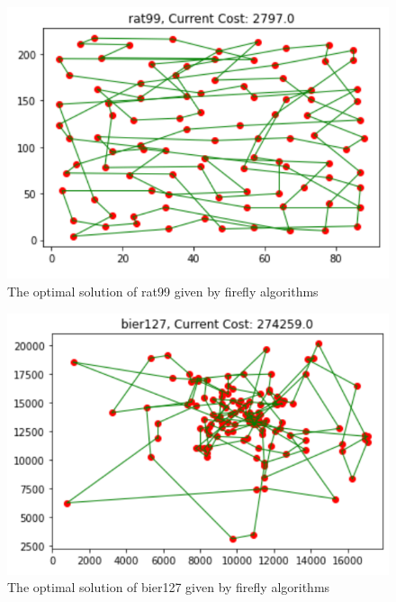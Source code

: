 \documentclass[twocolumn, a4paper]{extarticle}
\begin{document}
\begin{figure}[H]
	\centering
	\includegraphics[width=0.95\linewidth]{figure/fire_rat99}
	\caption{The optimal solution of rat99 given by firefly algorithms}
	\label{fig:firerat99}
\end{figure}

\begin{figure}[H]
	\centering
	\includegraphics[width=0.95\linewidth]{figure/fire_bier127}
	\caption{The optimal solution of bier127 given by firefly algorithms}
	\label{fig:firebier127}
\end{figure}
\end{document}
